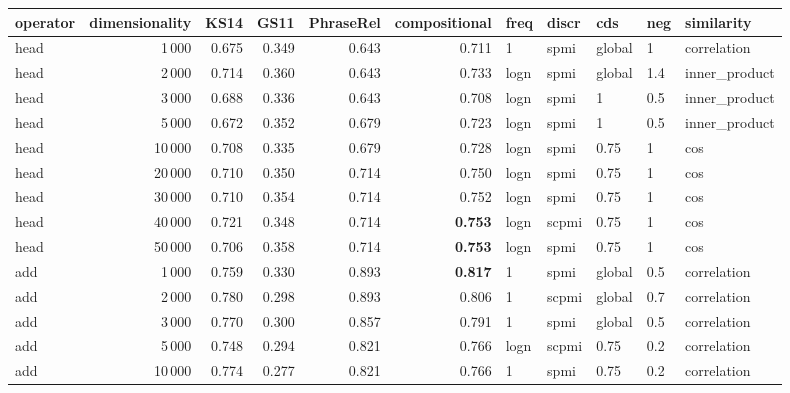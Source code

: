 \begin{tabular}{lrrrrrlllll}
\toprule
operator &  dimensionality &   KS14 &   GS11 &  PhraseRel &  compositional &  freq &  discr &     cds &  neg &     similarity \\
\midrule
    head &            1\,000 &  0.675 &  0.349 &      0.643 &          0.711 &     1 &   spmi &  global &    1 &    correlation \\
    head &            2\,000 &  0.714 &  0.360 &      0.643 &          0.733 &  logn &   spmi &  global &  1.4 &  inner\_product \\
    head &            3\,000 &  0.688 &  0.336 &      0.643 &          0.708 &  logn &   spmi &       1 &  0.5 &  inner\_product \\
    head &            5\,000 &  0.672 &  0.352 &      0.679 &          0.723 &  logn &   spmi &       1 &  0.5 &  inner\_product \\
    head &           10\,000 &  0.708 &  0.335 &      0.679 &          0.728 &  logn &   spmi &    0.75 &    1 &            cos \\
    head &           20\,000 &  0.710 &  0.350 &      0.714 &          0.750 &  logn &   spmi &    0.75 &    1 &            cos \\
    head &           30\,000 &  0.710 &  0.354 &      0.714 &          0.752 &  logn &   spmi &    0.75 &    1 &            cos \\
    head &           40\,000 &  0.721 &  0.348 &      0.714 &          \textbf{0.753} &  logn &  scpmi &    0.75 &    1 &            cos \\
    head &           50\,000 &  0.706 &  0.358 &      0.714 &          \textbf{0.753} &  logn &   spmi &    0.75 &    1 &            cos \\ \addlinespace
     add &            1\,000 &  0.759 &  0.330 &      0.893 &          \textbf{0.817} &     1 &   spmi &  global &  0.5 &    correlation \\
     add &            2\,000 &  0.780 &  0.298 &      0.893 &          0.806 &     1 &  scpmi &  global &  0.7 &    correlation \\
     add &            3\,000 &  0.770 &  0.300 &      0.857 &          0.791 &     1 &   spmi &  global &  0.5 &    correlation \\
     add &            5\,000 &  0.748 &  0.294 &      0.821 &          0.766 &  logn &  scpmi &    0.75 &  0.2 &    correlation \\
     add &           10\,000 &  0.774 &  0.277 &      0.821 &          0.766 &     1 &   spmi &    0.75 &  0.2 &    correlation \\

\end{tabular}
